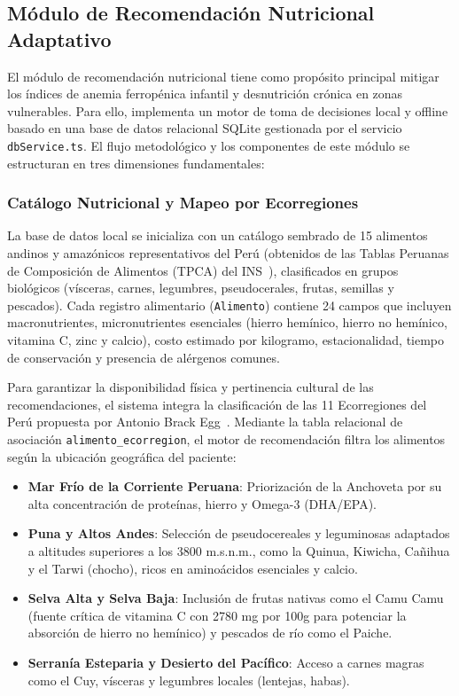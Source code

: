 \subsection{Módulo de Recomendación Nutricional Adaptativo}
\label{sec:modulo_nutricion}

El módulo de recomendación nutricional tiene como propósito principal mitigar los índices de anemia ferropénica infantil y desnutrición crónica en zonas vulnerables. Para ello, implementa un motor de toma de decisiones local y offline basado en una base de datos relacional SQLite gestionada por el servicio \texttt{dbService.ts}. El flujo metodológico y los componentes de este módulo se estructuran en tres dimensiones fundamentales:

\subsubsection{Catálogo Nutricional y Mapeo por Ecorregiones}
La base de datos local se inicializa con un catálogo sembrado de 15 alimentos andinos y amazónicos representativos del Perú (obtenidos de las Tablas Peruanas de Composición de Alimentos (TPCA) del INS~\cite{INS2023}), clasificados en grupos biológicos (vísceras, carnes, legumbres, pseudocerales, frutas, semillas y pescados). Cada registro alimentario (\texttt{Alimento}) contiene 24 campos que incluyen macronutrientes, micronutrientes esenciales (hierro hemínico, hierro no hemínico, vitamina C, zinc y calcio), costo estimado por kilogramo, estacionalidad, tiempo de conservación y presencia de alérgenos comunes.

Para garantizar la disponibilidad física y pertinencia cultural de las recomendaciones, el sistema integra la clasificación de las 11 Ecorregiones del Perú propuesta por Antonio Brack Egg~\cite{brack1986ecorregiones}. Mediante la tabla relacional de asociación \texttt{alimento\_ecorregion}, el motor de recomendación filtra los alimentos según la ubicación geográfica del paciente:
\begin{itemize}
    \item \textbf{Mar Frío de la Corriente Peruana}: Priorización de la Anchoveta por su alta concentración de proteínas, hierro y Omega-3 (DHA/EPA).
    \item \textbf{Puna y Altos Andes}: Selección de pseudocereales y leguminosas adaptados a altitudes superiores a los 3800 m.s.n.m., como la Quinua, Kiwicha, Cañihua y el Tarwi (chocho), ricos en aminoácidos esenciales y calcio.
    \item \textbf{Selva Alta y Selva Baja}: Inclusión de frutas nativas como el Camu Camu (fuente crítica de vitamina C con 2780 mg por 100g para potenciar la absorción de hierro no hemínico) y pescados de río como el Paiche.
    \item \textbf{Serranía Esteparia y Desierto del Pacífico}: Acceso a carnes magras como el Cuy, vísceras y legumbres locales (lentejas, habas).
\end{itemize}

